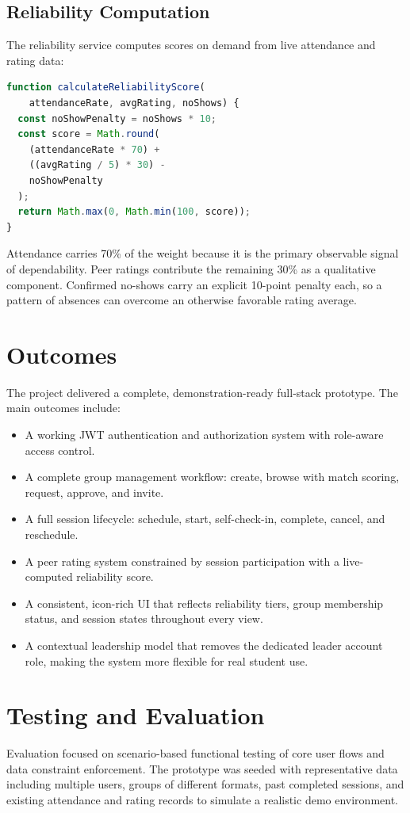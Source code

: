 \documentclass[conference]{IEEEtran}
\begin{document}
\subsection{Reliability Computation}
The reliability service computes scores on demand from live attendance and rating data:

\begin{lstlisting}[language=JavaScript, caption={Core reliability scoring logic}]
function calculateReliabilityScore(
    attendanceRate, avgRating, noShows) {
  const noShowPenalty = noShows * 10;
  const score = Math.round(
    (attendanceRate * 70) +
    ((avgRating / 5) * 30) -
    noShowPenalty
  );
  return Math.max(0, Math.min(100, score));
}
\end{lstlisting}

Attendance carries 70\% of the weight because it is the primary observable signal of dependability. Peer ratings contribute the remaining 30\% as a qualitative component. Confirmed no-shows carry an explicit 10-point penalty each, so a pattern of absences can overcome an otherwise favorable rating average.

\section{Outcomes}
The project delivered a complete, demonstration-ready full-stack prototype. The main outcomes include:

\begin{itemize}
    \item A working JWT authentication and authorization system with role-aware access control.
    \item A complete group management workflow: create, browse with match scoring, request, approve, and invite.
    \item A full session lifecycle: schedule, start, self-check-in, complete, cancel, and reschedule.
    \item A peer rating system constrained by session participation with a live-computed reliability score.
    \item A consistent, icon-rich UI that reflects reliability tiers, group membership status, and session states throughout every view.
    \item A contextual leadership model that removes the dedicated leader account role, making the system more flexible for real student use.
\end{itemize}

\section{Testing and Evaluation}
Evaluation focused on scenario-based functional testing of core user flows and data constraint enforcement. The prototype was seeded with representative data including multiple users, groups of different formats, past completed sessions, and existing attendance and rating records to simulate a realistic demo environment.
\end{document}
